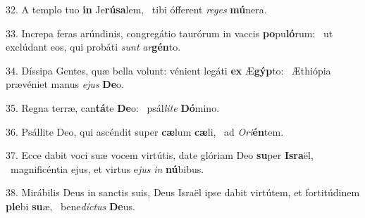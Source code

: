 32. A templo tuo \textbf{in} Je\textbf{rú}\textbf{sa}lem, \ast\  tibi ófferent \textit{re}\textit{ges} \textbf{mú}nera.\

33. Increpa feras arúndinis, congregátio taurórum in vaccis \textbf{po}pu\textbf{ló}rum: \ast\  ut exclúdant eos, qui probáti \textit{sunt} \textit{ar}\textbf{gén}to.\

34. Díssipa Gentes, quæ bella volunt: vénient legáti \textbf{ex} Æ\textbf{gýp}to: \ast\  Æthiópia prævéniet manus \textit{e}\textit{jus} \textbf{De}o.\

35. Regna terræ, can\textbf{tá}te \textbf{De}o: \ast\  psál\textit{li}\textit{te} \textbf{Dó}mino.\

36. Psállite Deo, qui ascéndit super \textbf{cæ}lum \textbf{cæ}li, \ast\  ad \textit{O}\textit{ri}\textbf{én}tem.\

37. Ecce dabit voci suæ vocem virtútis, date glóriam Deo \textbf{su}per \textbf{Is}\textbf{ra}ël, \ast\  magnificéntia ejus, et virtus e\textit{jus} \textit{in} \textbf{nú}bibus.\

38. Mirábilis Deus in sanctis suis, Deus Israël ipse dabit virtútem, et fortitúdinem \textbf{ple}bi \textbf{su}æ, \ast\  bene\textit{díc}\textit{tus} \textbf{De}us.\

